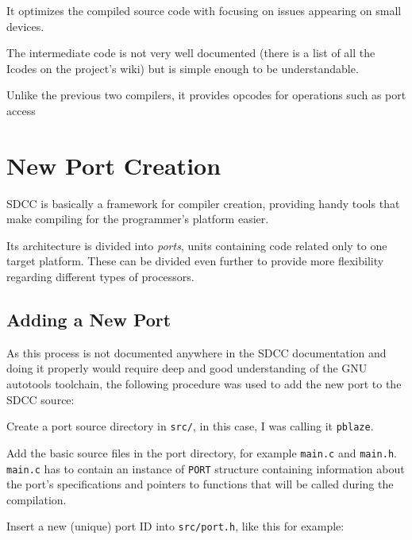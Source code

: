    It optimizes the compiled source code with focusing on issues appearing on small devices.

    The intermediate code is not very well documented (there is a list of all the Icodes on the project's wiki) but is simple enough to be understandable.

    Unlike the previous two compilers, it provides opcodes for operations such as port access %
    

\chapter{New Port Creation}\label{port}

SDCC is basically a framework for compiler creation, providing handy tools that make compiling for the programmer's platform easier.

Its architecture is divided into \emph{ports}, units containing code related only to one target platform. These can be divided even further to provide more flexibility regarding different types of processors.

    \section{Adding a New Port}

    As this process is not documented anywhere in the SDCC documentation and doing it properly would require deep and good understanding of the GNU autotools toolchain, the following procedure was used to add the new port to the SDCC source:


    Create a port source directory in \texttt{src/}, in this case, I was calling it \texttt{pblaze}.

    Add the basic source files in the port directory, for example \texttt{main.c} and \texttt{main.h}. \texttt{main.c} has to contain an instance of \texttt{PORT} structure containing information about the port's specifications and pointers to functions that will be called during the compilation.

    Insert a new (unique) port ID into \texttt{src/port.h}, like this for example:



